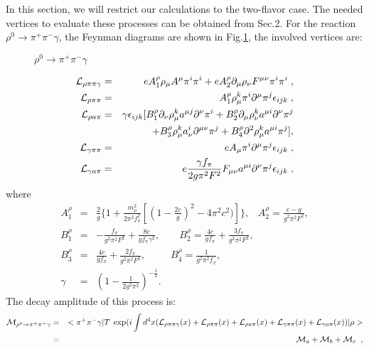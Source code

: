 In this section, we will restrict our calculations to the two-flavor case. 
The needed vertices to evaluate these processes can be obtained from
Sec.2. For the reaction $\rho^0 \rightarrow \pi^+\pi^-\gamma$, 
the Feynman diagrams are shown in Fig.\ref{figure:0(a)},
the involved vertices are:
\begin{figure}[h]
   \centering
   \caption{$\rho^0 \rightarrow \pi^+ \pi^-\gamma$}
   \label{figure:0(a)}
\end{figure}
\begin{eqnarray}
{\cal L}_{\rho\pi\pi\gamma}
&=&eA_1^\rho\rho_{\mu}A^\mu\pi^i\pi^i+
eA_2^\rho\partial_\mu\rho_\nu F^{\mu\nu}\pi^i\pi^i{\;},\\
{\cal L}_{\rho\pi\pi}&=&
A_1^\rho
\rho_{\mu}^k\pi^i\partial^\mu\pi^j\epsilon_{ijk}{\;}, \\
{\cal L}_{\rho{a}\pi}&=&\gamma\epsilon_{ijk}[ 
B_1^\rho
\partial_\nu\rho_\mu^k a^{\mu j}\partial^\nu\pi^i +
B_2^\rho
\partial_\mu\rho_\nu^k a^{\mu i}\partial^\nu\pi^j \nonumber\\
& &+B_3^\rho
\rho_{\mu}^k a_{\nu}^i\partial^{\mu\nu}\pi^j
+B_4^\rho
\partial^2\rho_\mu^k a^{\mu i}\pi^j],\\
{\cal
L}_{\gamma\pi\pi}&=&eA_\mu\pi^i\partial^\mu\pi^j\epsilon_{ijk}{\;},\\
{\cal L}_{\gamma a \pi}&=&e\frac{\gamma f_\pi}{2g\pi^2
F^2}F_{\mu\nu}a^{\mu i}\partial^{\nu}\pi^j
\epsilon_{ijk}{\;},
\end{eqnarray}
where
\begin{eqnarray}
A_1^\rho&=&\frac{2}{g}
\{1+\frac{m^2_\rho}{2\pi^2 f^2_\pi}[(1-\frac{2c}{g})^2-4\pi^2
c^2)]\},\;\;\;
A_2^\rho=\frac{c-g} {g^2\pi^2 F^2}, \nonumber \\
B_1^\rho&=&-\frac{f_\pi}{g^2\pi^2 F^2}+\frac{8c}{g f_\pi \gamma^2},
\;\;\;\;\;\;\;
B_2^\rho=\frac{4c}{g f_\pi}+\frac{3f_\pi}{g^2\pi^2 F^2}, \nonumber \\
B_3^\rho&=&\frac{4c}{g f_\pi}+\frac{2f_\pi}{g^2\pi^2 F^2},
\;\;\;\;\;\;\;\;\;
B_4^\rho=\frac{1}{g^2\pi^2 f_\pi} ,\nonumber \\
\gamma&=&(1-\frac{1}{2g^2\pi^2})^{-\frac{1}{2}}.
\end{eqnarray}
The decay amplitude of this process is:
\begin{eqnarray}
{\cal M}_{\rho^0 \rightarrow \pi^+\pi^-\gamma}&=&<\pi^+\pi^-\gamma\vert
T\;\exp(i\int d^4 x ({\cal L}_{\rho\pi\pi\gamma}(x)+{\cal
L}_{\rho\pi\pi}(x) 
+{\cal L}_{\rho{a}\pi}(x)+{\cal L}_{\gamma\pi\pi}(x)+{\cal L}_{\gamma a
\pi}(x) )\vert \rho > \nonumber \\
&=&{\cal M}_a+{\cal M}_b+{\cal M}_c \;\;,
\end{eqnarray}
